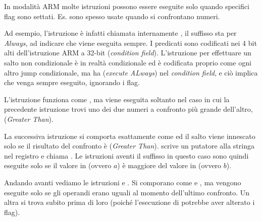 \label{subsec:jcc_ARM}

\mysubparagraph{\OptimizingKeilVI (\ARMMode)}




In modalità ARM molte istruzioni possono essere eseguite solo quando specifici flag sono settati.
Es. sono spesso usate quando si confrontano numeri.


Ad esempio, l'istruzione \ADD è infatti chiamata internamente , il suffisso  sta per
\emph{Always}, ad indicare che viene eseguita sempre.
I predicati sono codificati nei 4 bit alti dell'istruzione ARM a 32-bit (\emph{condition field}).
L'istruzione  per effettuare un salto non condizionale è in realtà condizionale ed è codificata proprio come ogni altro
jump condizionale, ma ha  (\emph{execute ALways}) nel \emph{condition field}, e ciò implica che venga sempre eseguito, ignorando i flag.


L'istruzione  funziona come , ma viene eseguita soltanto nel caso in cui la precedente istruzione \CMP
trovi uno dei due numeri a confronto più grande dell'altro, (\emph{Greater Than}).


La successiva istruzione  si comporta esattamente come  
ed il salto viene innescato solo se il risultato del confronto è (\emph{Greater Than}). 
 scrive un putatore alla stringa  nel registro  e  chiama \printf.
Le istruzioni aventi il suffisso  in questo caso sono quindi eseguite solo se il valore in  (ovvero $a$) è maggiore del valore 
in  (ovvero $b$).


Andando avanti vediamo le istruzioni  e .
Si comporano come  e , ma vengono eseguite solo se gli operandi erano uguali al momento dell'ultimo confronto.
Un altra \CMP si trova subito prima di loro (poiché l'esecuzione di \printf potrebbe aver alterato i flag).

